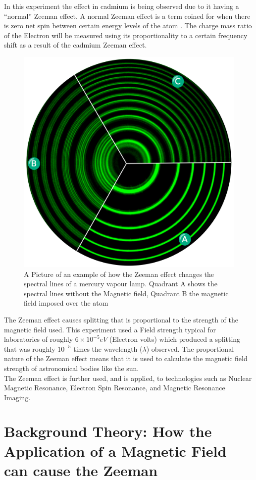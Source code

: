 \documentclass[a4paper,11pt]{article}
\begin{document}
In this experiment the effect in cadmium is being observed due to it having a “normal” Zeeman effect. A normal Zeeman effect is a term coined for when there is zero net spin between certain energy levels of the atom \cite{SCH1}. The charge mass ratio of the Electron will be measured using its proportionality to a certain frequency shift as a result of the cadmium Zeeman effect.\\

 \begin{figure}[htb!]
       \centering
       \includegraphics[width=0.4\columnwidth]{Images/Wiki Zeeman Effect.png}
        \caption{A Picture of an example of how the Zeeman effect changes the spectral lines of a mercury vapour lamp. Quadrant A shows the spectral lines without the Magnetic field, Quadrant B the magnetic field imposed over the atom \cite{Wikapidea Image 1}}
        \label{plot:Image of Zeeman Effect}
 \end{figure}

The Zeeman effect causes splitting that is proportional to the strength of the magnetic field used. This experiment used a Field strength typical for laboratories of roughly $6\times{10}^{-5}eV$ (Electron volts) which produced a splitting that was roughly ${10}^{-5}$ times the wavelength ($\lambda$) observed. The proportional nature of the Zeeman effect means that it is used to calculate the magnetic field strength of astronomical bodies like the sun. \cite{Zeeman Mag Fields} \cite{Star Zeeman}\\

The Zeeman effect is further used, and is applied, to technologies such as Nuclear Magnetic Resonance, Electron Spin Resonance, and Magnetic Resonance Imaging.\\

\section{Background Theory: How the Application of a Magnetic Field can cause the Zeeman} 
\end{document}
